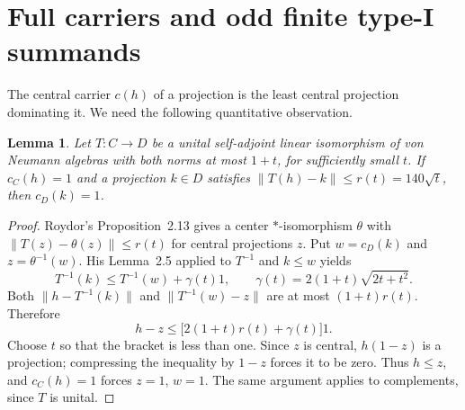 \documentclass[11pt]{article}
\newtheorem{lemma}[theorem]{Lemma}
\begin{document}
\section{Full carriers and odd finite type-I summands}
The central carrier $c(h)$ of a projection is the least central
projection dominating it. We need the following quantitative observation.
\begin{lemma}\label{lem:carrier}
Let $T:C\to D$ be a unital self-adjoint linear isomorphism of von
Neumann algebras with both norms at most $1+t$, for sufficiently small
$t$. If $c_C(h)=1$ and a projection $k\in D$ satisfies
$\|T(h)-k\|\le r(t)=140\sqrt t$, then $c_D(k)=1$.
\end{lemma}
\begin{proof}
Roydor's Proposition~2.13 gives a center $*$-isomorphism $\theta$
with $\|T(z)-\theta(z)\|\le r(t)$ for central projections $z$.
Put $w=c_D(k)$ and $z=\theta^{-1}(w)$. His Lemma~2.5 applied to
$T^{-1}$ and $k\le w$ yields
\[
 T^{-1}(k)\le T^{-1}(w)+\gamma(t)1,
 \qquad \gamma(t)=2(1+t)\sqrt{2t+t^2}.
\]
Both $\|h-T^{-1}(k)\|$ and $\|T^{-1}(w)-z\|$ are at most
$(1+t)r(t)$. Therefore
\[
 h-z\le\bigl[2(1+t)r(t)+\gamma(t)\bigr]1.
\]
Choose $t$ so that the bracket is less than one. Since $z$ is central,
$h(1-z)$ is a projection; compressing the inequality by $1-z$ forces
it to be zero. Thus $h\le z$, and $c_C(h)=1$ forces $z=1$, $w=1$.
The same argument applies to complements, since $T$ is unital.
\end{proof}
\end{document}
